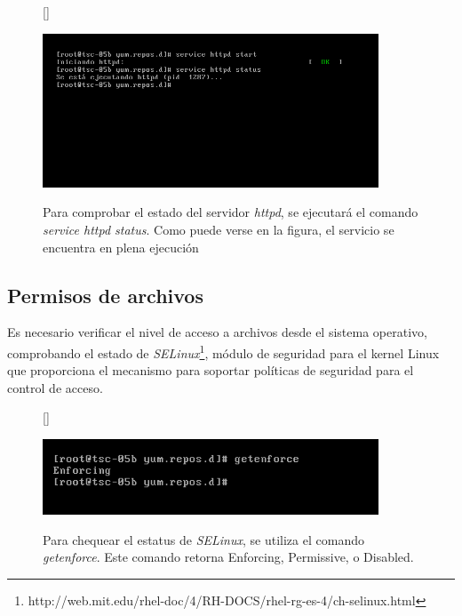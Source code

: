 \documentclass[11pt]{article}
\begin{document}
\begin{figure}[ht]
[\FBwidth]
{\caption{Para comprobar el estado del servidor \textit{httpd}, se ejecutará el comando \textit{service httpd status}. Como puede verse en la figura, el servicio se encuentra en plena ejecución}\label{fig:httpdServiceStatus}}
{\includegraphics[width=10cm]{screenshots/httpd-run/service-httpd-status.png}}
\end{figure}

\newpage
\subsection{Permisos de archivos}
Es necesario verificar el nivel de acceso a archivos desde el sistema operativo, comprobando el estado de \textit{SELinux}\footnote{http://web.mit.edu/rhel-doc/4/RH-DOCS/rhel-rg-es-4/ch-selinux.html}, módulo de seguridad para el kernel Linux que proporciona el mecanismo para soportar políticas de seguridad para el control de acceso.
\begin{figure}[ht]
[\FBwidth]
{\caption{Para chequear el estatus de \textit{SELinux}, se utiliza el comando \textit{getenforce}. Este comando retorna Enforcing, Permissive, o Disabled.}\label{fig:getenforce}}
{\includegraphics[width=10cm]{screenshots/permissions/getenforce.png}}
\end{figure}
\end{document}
